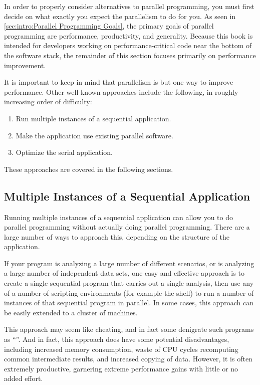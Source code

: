 In order to properly consider alternatives to parallel programming,
you must first decide on what exactly you expect the parallelism
to do for you.
As seen in \cref{sec:intro:Parallel Programming Goals},
the primary goals of parallel programming are performance, productivity,
and generality.
Because this book is intended for developers working on
performance-critical code near the bottom of the software stack,
the remainder of this section focuses primarily on performance improvement.

It is important to keep in mind that parallelism is but one way to
improve performance.
Other well-known approaches include the following, in roughly increasing
order of difficulty:

\begin{enumerate}
\item	Run multiple instances of a sequential application.
\item	Make the application use existing parallel software.
\item	Optimize the serial application.
\end{enumerate}

These approaches are covered in the following sections.

\subsection{Multiple Instances of a Sequential Application}
\label{sec:intro:Multiple Instances of a Sequential Application}

Running multiple instances of a sequential application can allow you
to do parallel programming without actually doing parallel programming.
There are a large number of ways to approach this, depending on the
structure of the application.

If your program is analyzing a large number of different scenarios,
or is analyzing a large number of independent data sets, one easy
and effective approach is to create a single sequential program that
carries out a single analysis, then use any of a number of scripting
environments (for example the  shell) to run a number of
instances of that sequential program in parallel.
In some cases, this approach can be easily extended to a cluster of
machines.

This approach may seem like cheating, and in fact some denigrate such
programs as ``''.
And in fact, this approach does have some potential disadvantages,
including increased memory consumption, waste of CPU cycles recomputing
common intermediate results, and increased copying of data.
However, it is often  extremely productive, garnering extreme performance
gains with little or no added effort.

